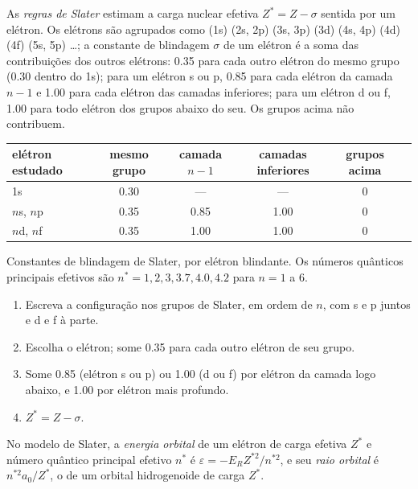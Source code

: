 \begin{definition}\label{def:b2:atomic-orbitals:slater}
As \emph{regras de Slater} estimam a carga nuclear efetiva
$Z^* = Z - \sigma$ sentida por um elétron. Os elétrons são agrupados como
(1s) (2s, 2p) (3s, 3p) (3d) (4s, 4p) (4d) (4f) (5s, 5p) \dots; a constante de
blindagem $\sigma$ de um elétron é a soma das contribuições dos outros
elétrons: 0.35 para cada outro elétron do mesmo grupo (0.30 dentro do 1s);
para um elétron s ou p, 0.85 para cada elétron da camada $n - 1$ e 1.00 para
cada elétron das camadas inferiores; para um elétron d ou f, 1.00 para todo
elétron dos grupos abaixo do seu. Os grupos acima não contribuem.
\end{definition}

\begin{omfigure}
\small
\renewcommand{\arraystretch}{1.2}
\begin{tabular}{l|ccccc}
elétron estudado & mesmo grupo & camada $n - 1$ & camadas inferiores & grupos acima \\ \hline
1s & 0.30 & --- & --- & 0 \\
$n$s, $n$p & 0.35 & 0.85 & 1.00 & 0 \\
$n$d, $n$f & 0.35 & 1.00 & 1.00 & 0 \\
\end{tabular}

\smallskip
{\small Constantes de blindagem de Slater, por elétron blindante. Os números
quânticos principais efetivos são $n^* = 1, 2, 3, 3.7, 4.0, 4.2$ para $n = 1$ a 6.}
\end{omfigure}

\begin{method}\label{met:b2:atomic-orbitals:slater}
\begin{enumerate}
  \item Escreva a configuração nos grupos de Slater, em ordem de $n$, com s e p
        juntos e d e f à parte.
  \item Escolha o elétron; some 0.35 para cada outro elétron de seu grupo.
  \item Some 0.85 (elétron s ou p) ou 1.00 (d ou f) por elétron da camada
        logo abaixo, e 1.00 por elétron mais profundo.
  \item $Z^* = Z - \sigma$.
\end{enumerate}
\end{method}

\begin{definition}\label{def:b2:atomic-orbitals:orbital-energy}
No modelo de Slater, a \emph{energia orbital} de um elétron
de carga efetiva $Z^*$ e número quântico principal efetivo $n^*$ é
$\varepsilon = -E_RZ^{*2}/n^{*2}$, e seu \emph{raio orbital}
é $n^{*2}a_0/Z^*$, o  de um orbital hidrogenoide de carga
$Z^*$.
\end{definition}

